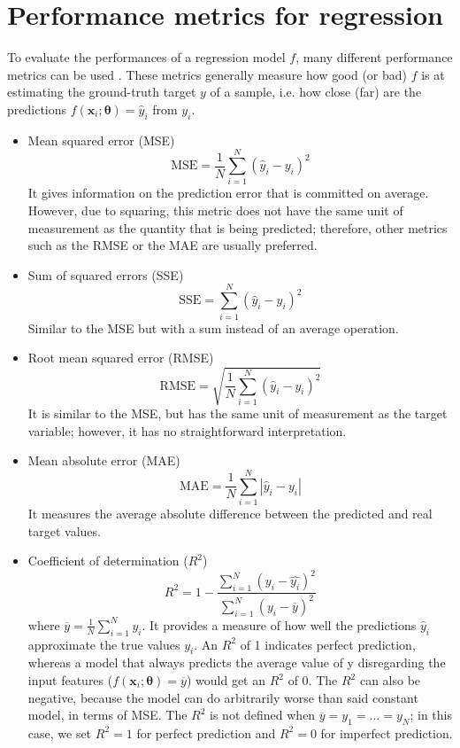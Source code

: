 \section{Performance metrics for regression}
\label{sec:metrics}
To evaluate the performances of a regression model $f$, many different performance metrics can be used \cite{metrics}. These metrics generally measure how good (or bad) $f$ is at estimating the ground-truth target $y$ of a sample, i.e. how close (far) are the predictions $f(\mathbf{x}_{i};\bm{\theta}) = \hat{y}_i$ from $y_i$.
\begin{itemize}
    \item Mean squared error (MSE)
    \[
    \text{MSE} = \frac{1}{N} \sum_{i=1}^N (\hat{y}_i-y_i)^2
    \]
    It gives information on the prediction error that is committed on average. However, due to squaring, this metric does not have the same unit of measurement as the quantity that is being predicted; therefore, other metrics such as the RMSE or the MAE are usually preferred.
    \item Sum of squared errors (SSE)
    \[
    \text{SSE} = \sum_{i=1}^N (\hat{y}_i-y_i)^2
    \]
    Similar to the MSE but with a sum instead of an average operation.
    \item Root mean squared error (RMSE)
    \[
    \text{RMSE} = \sqrt{\frac{1}{N} \sum_{i=1}^N (\hat{y}_i-y_i)^2}
    \]
    It is similar to the MSE, but has the same unit of measurement as the target variable; however, it has no straightforward interpretation.
    \item Mean absolute error (MAE)
    \[
    \text{MAE} = \frac{1}{N} \sum_{i=1}^N |\hat{y}_i-y_i|
    \]
    It measures the average absolute difference between the predicted and real target values.
    \item Coefficient of determination ($R^2$)
    \[
    R^2 = 1 - \frac{\sum_{i=1}^N (y_i-\hat{y_i})^2}{\sum_{i=1}^N (y_i-\overline{y})^2}
    \]
    where $\overline{y}=\frac{1}{N}\sum_{i=1}^N y_i$.
    It provides a measure of how well the predictions $\hat{y}_i$ approximate the true values $y_i$. An $R^2$ of 1 indicates perfect prediction, whereas a model that always predicts the average value of y disregarding the input features ($f(\mathbf{x}_{i};\bm{\theta})=\overline{y}$) would get an $R^2$ of 0. The $R^2$ can also be negative, because the model can do arbitrarily worse than said constant model, in terms of MSE.
    The $R^2$ is not defined when $\overline{y}=y_1=\dots=y_N$; in this case, we set $R^2=1$ for perfect prediction and $R^2=0$ for imperfect prediction.
\end{itemize}





